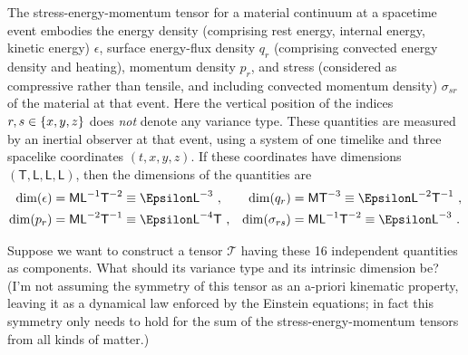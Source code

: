 \documentclass[\ifafour a4paper,12pt,\else a5paper,10pt,\fi%
onecolumn,oneside,article,%
british%
]{memoir}
\theoremstyle{remark}
\theoremstyle{innote}
\DeclarePairedDelimiter\set{\{}{\}}
\renewcommand*{\|}[1][]{\nonscript\,#1\vert\nonscript\;\mathopen{}}
\newcommand*{\Le}{\textsf{L}}
\newcommand*{\Ti}{\textsf{T}}
\newcommand*{\Ma}{\textsf{M}}
\newcommand*{\En}{\Epsilon}%
\newcommand*{\yT}{\bm{\mathcal{T}}}
\newcommand*{\en}{\epsilon}
\newcommand*{\yq}{q}
\newcommand*{\yp}{p}
\newcommand*{\yt}{\sigma}
\begin{document}
The stress-energy-momentum tensor for a material continuum at a spacetime
event embodies the energy density (comprising rest energy, internal energy,
kinetic energy) $\en$, surface energy-flux density $\yq_{r}$ (comprising
convected energy density and heating), momentum density $\yp_{r}$, and
stress (considered as compressive rather than tensile, and including
convected momentum density) $\yt_{sr}$ of the material at that event. Here
the vertical position of the indices $r,s \in \set{x,y,z}$ does \emph{not}
denote any variance type. These quantities are measured by an inertial
observer at that event, using a system of one timelike and three spacelike
coordinates $(t,x,y,z)$. If these coordinates have dimensions
$(\Ti,\Le,\Le,\Le)$, then the dimensions of the quantities are
\begin{equation}\label{eq:dims_stress_components}
  \begin{aligned}
    \dim(\en) &=\Ma\Le^{-1}\Ti^{-2} \equiv  \En\Le^{-3} \ ,
    &
    \dim(\yq_{r}) &=\Ma\Ti^{-3} \equiv  \En\Le^{-2}\Ti^{-1} \ ,
    \\
    \dim(\yp_{r}) &=\Ma\Le^{-2}\Ti^{-1} \equiv  \En\Le^{-4}\Ti \ ,
    &
    \dim(\yt_{rs}) &=\Ma\Le^{-1}\Ti^{-2} \equiv  \En\Le^{-3} \ .
  \end{aligned}
\end{equation}

Suppose we want to construct a tensor $\yT$ having these 16 independent
quantities as components. What should its variance type and its intrinsic
dimension be? (I'm not assuming the symmetry of this tensor as an a-priori
kinematic property, leaving it as a dynamical law enforced by the Einstein
equations; in fact this symmetry only needs to hold for the sum of the
stress-energy-momentum tensors from all kinds of matter.)
\end{document}
